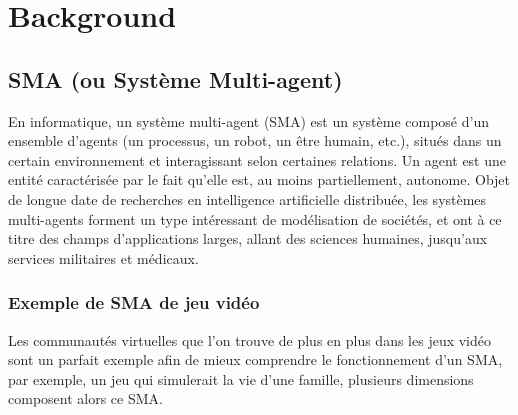 
\chapter{Background} %

\label{Chapter3} %


\section{SMA (ou Système Multi-agent)}

En informatique, un système multi-agent (SMA) est un système composé d'un ensemble d'agents (un processus, un robot, un être humain, etc.), situés dans un certain environnement et interagissant selon certaines relations. Un agent est une entité caractérisée par le fait qu'elle est, au moins partiellement, autonome.
Objet de longue date de recherches en intelligence artificielle distribuée, les systèmes multi-agents forment un type intéressant de modélisation de sociétés, et ont à ce titre des champs d'applications larges, allant des sciences humaines, jusqu’aux services militaires et médicaux. \parencite{sma}


\subsection{Exemple de SMA de jeu vidéo}

Les communautés virtuelles que l’on trouve de plus en plus dans les jeux vidéo sont un parfait exemple afin de mieux comprendre le fonctionnement d’un SMA, par exemple, un jeu qui simulerait la vie d’une famille, plusieurs dimensions composent alors ce SMA.

